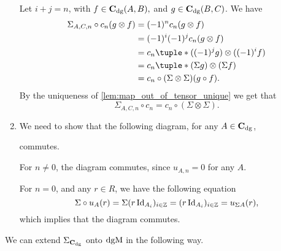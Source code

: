 \begin{remark}
\begin{enumerate}
{            Let \( i + j = n \), with \( f \in \operatorname{\mathbf{C}}_{\operatorname{dg}}(A, B), \) and \( g \in \operatorname{\mathbf{C}}_{\operatorname{dg}}(B, C) \). We have
            \begin{align*}
                \Sigma_{A, C, n} \circ c_n (g \otimes f) &= (-1)^n c_n (g \otimes f) \\
                &= (-1)^i (-1)^j c_n (g \otimes f) \\
                &= c_n\tuple*{((-1)^j g) \otimes ((-1)^i f)} \\
                &= c_n\tuple*{(\Sigma g) \otimes (\Sigma f)} \\
                &= c_n \circ (\Sigma \otimes \Sigma) (g \circ f).
            \end{align*}
            By the uniqueness of \autoref{lem:map_out_of_tensor_unique} we get that
            \[
                \Sigma_{A, C, n} \circ c_n = c_n \circ (\Sigma \otimes \Sigma).
            \]
        }
        \item {
            We need to show that the following diagram, for any \( A \in \operatorname{\mathbf{C}}_{\operatorname{dg}} \),
            \begin{center}
            \end{center}
            commutes.

            For \( n \neq 0 \), the diagram commutes, since \( u_{A, n} = 0 \) for any \( A \).

            For \( n = 0 \), and any \( r \in R \), we have the following equation
            \[
                \Sigma \circ u_A (r) = \Sigma (r \operatorname{Id}_{A_i})_{i \in {\mathbb{Z}}} = (r \operatorname{Id}_{A_i})_{i \in {\mathbb{Z}}} = u_{\Sigma A} (r),
            \]
            which implies that the diagram commutes.
        }
    \end{enumerate}
\end{remark}

We can extend \( \Sigma_{\operatorname{\mathbf{C}}_{\operatorname{dg}}} \) onto \( \operatorname{dgM} \) in the following way.

